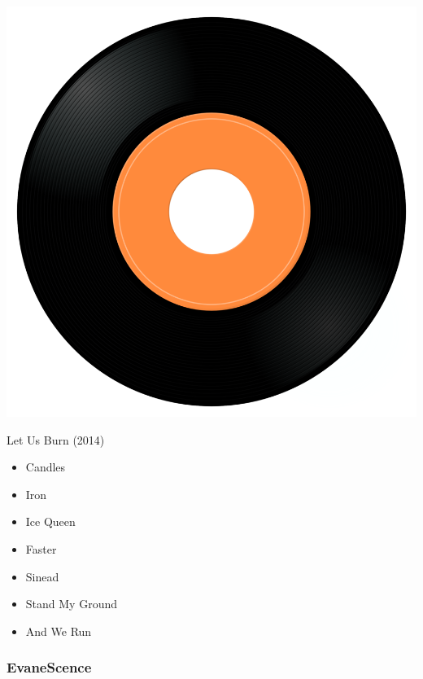 \begin{minipage}[t]{0.25\textwidth}
\captionsetup{type=figure}
\includegraphics[width=\textwidth]{Images/cover.png}
\caption*{Let Us Burn (2014)}
\end{minipage}
\begin{minipage}[t]{0.25\textwidth}\vspace{0pt}
\begin{itemize}[nosep,leftmargin=1em,labelwidth=*,align=left]
	\setlength{\itemsep}{0pt}
	\item Candles
	\item Iron
	\item Ice Queen
	\item Faster
	\item Sinead
	\item Stand My Ground
	\item And We Run
\end{itemize}
\end{minipage}

\subsubsection{EvaneScence}

